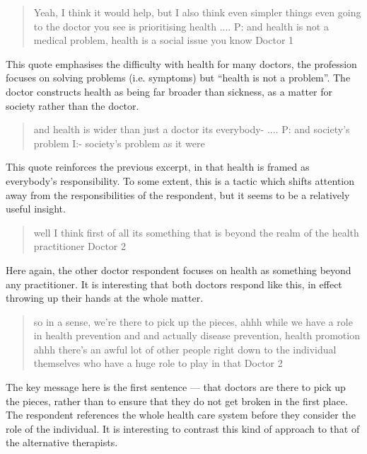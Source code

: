 \begin{quotation}
  Yeah, I think it would help, but I also think even simpler things even going to the doctor you see is prioritising health
....
P: and health is not a medical problem, health is a social issue you know
Doctor 1
\end{quotation}

This quote emphasises the difficulty with health for many doctors, the profession focuses on solving problems (i.e. symptoms) but ``health is not a problem''. The doctor constructs health as being far broader than sickness, as a matter for society rather than the doctor. 

\begin{quotation}
  and health is wider than just a doctor its everybody-
....
P: and society's problem 
I:- society's problem as it were

\end{quotation}

This quote reinforces the previous excerpt, in that health is framed as everybody's responsibility. To some extent, this is a tactic which shifts attention away from the responsibilities of the respondent, but it seems to be a relatively useful insight. 

\begin{quotation}
  well I think first of all its something that is beyond the realm of the health practitioner 
Doctor 2
\end{quotation}

Here again, the other doctor respondent focuses on health as something beyond any practitioner. It is interesting that both doctors respond like this, in effect throwing up their hands at the whole matter. 

\begin{quotation}
  so in a sense, we're there to pick up the pieces, ahhh while we have a role in health prevention and and actually disease prevention, health promotion ahhh there's an awful lot of other people right down to the individual themselves who have a huge role to play in that
Doctor 2
\end{quotation}

The key message here is the first sentence --- that doctors are there to pick up the pieces, rather than to ensure that they do not get broken in  the first place. The respondent references the whole health care system before they consider the role of the individual. It is interesting to contrast this kind of approach to that of the alternative therapists. 

